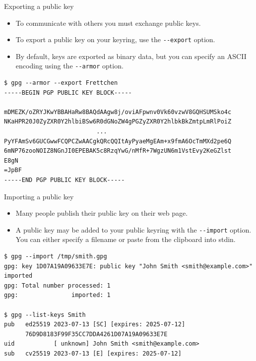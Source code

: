 \documentclass[
mode=present,
paper=smartboard,
size=20pt,
]{powerdot}
\newcommand\vsp{\vspace{-16mm}}
\newcommand{\clopt}[1]{\texttt{{-}#1}}
\begin{document}
\begin{slide}[method=direct]{Exporting a public key}
  \begin{itemize}
  \item To communicate with others you must exchange public keys.
  \item To export a public key on your keyring, use the
    \clopt{-export} option.
  \item By default, keys are exported as binary data, but you can
    specify an ASCII encoding using the \clopt{-armor} option.
  \end{itemize}
\vsp
\begin{verbatim}
$ gpg --armor --export Frettchen
-----BEGIN PGP PUBLIC KEY BLOCK-----

mDMEZK/oZRYJKwYBBAHaRw8BAQdAAgw8j/oviAFpwnv0Vk60vzwV8GQHSUMSko4c
NKaHPR20J0ZyZXR0Y2hlbiBSw6R0dGNoZW4gPGZyZXR0Y2hlbkBkZmtpLmRlPoiZ
                          ...
PyYFAmSv6GUCGwwFCQPCZwAACgkQRcQQItAyPyaeMgEAm+x9fmA6OcTmMXd2pe6Q
6mNP76zooNOIZ8NGnJI0EPEBAK5c8RzqYwG/nMfR+7WgzUN6m1VstEvy2KeGZlst
E8gN
=JpBF
-----END PGP PUBLIC KEY BLOCK-----
\end{verbatim}
\end{slide}

\begin{slide}[method=direct]{Importing a public key}
  \begin{itemize}
  \item Many people publish their public key on their web page.
  \item A public key may be added to your public keyring with the
    \clopt{-import} option. You can either specify a filename or paste
    from the clipboard into stdin.
  \end{itemize}
\begin{verbatim}
$ gpg --import /tmp/smith.gpg
gpg: key 1D07A19A09633E7E: public key "John Smith <smith@example.com>" imported
gpg: Total number processed: 1
gpg:               imported: 1

$ gpg --list-keys Smith
pub   ed25519 2023-07-13 [SC] [expires: 2025-07-12]
      76D9D8183F99F35CC7DDA4261D07A19A09633E7E
uid           [ unknown] John Smith <smith@example.com>
sub   cv25519 2023-07-13 [E] [expires: 2025-07-12]
\end{verbatim}
\end{slide}
\end{document}
